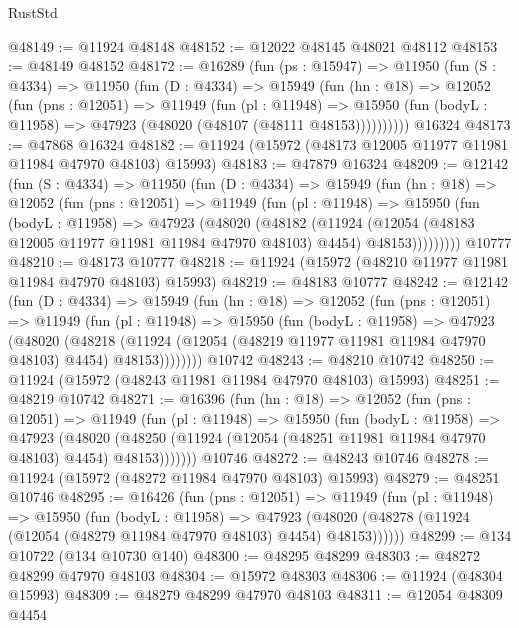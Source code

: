 \begin{lexlean}{RustStd}
\begin{coremodule}
{\begin{coremodule}
{{{{{{{{{{{{{{{{{{{{{{{{{{{{{{{{{{{{{{{{{{{{{{{{{{{{{{{{{{{{{{{{{{{{{{{{{{{{{{{{@48149 := @11924 @48148
@48152 := @12022 @48145 @48021 @48112
@48153 := @48149 @48152
@48172 := @16289
    (fun (ps : @15947) =>
    @11950
      (fun (S : @4334) =>
      @11950
        (fun (D : @4334) =>
        @15949
          (fun (hn : @18) =>
          @12052
            (fun (pns : @12051) =>
            @11949
              (fun (pl : @11948) =>
              @15950 (fun (bodyL : @11958) => @47923 (@48020 (@48107 (@48111 @48153))))))))))
    @16324
@48173 := @47868 @16324
@48182 := @11924 (@15972 (@48173 @12005 @11977 @11981 @11984 @47970 @48103) @15993)
@48183 := @47879 @16324
@48209 := @12142
    (fun (S : @4334) =>
    @11950
      (fun (D : @4334) =>
      @15949
        (fun (hn : @18) =>
        @12052
          (fun (pns : @12051) =>
          @11949
            (fun (pl : @11948) =>
            @15950
              (fun (bodyL : @11958) =>
              @47923
                (@48020
                  (@48182
                    (@11924
                      (@12054 (@48183 @12005 @11977 @11981 @11984 @47970 @48103) @4454)
                      @48153)))))))))
    @10777
@48210 := @48173 @10777
@48218 := @11924 (@15972 (@48210 @11977 @11981 @11984 @47970 @48103) @15993)
@48219 := @48183 @10777
@48242 := @12142
    (fun (D : @4334) =>
    @15949
      (fun (hn : @18) =>
      @12052
        (fun (pns : @12051) =>
        @11949
          (fun (pl : @11948) =>
          @15950
            (fun (bodyL : @11958) =>
            @47923
              (@48020
                (@48218
                  (@11924 (@12054 (@48219 @11977 @11981 @11984 @47970 @48103) @4454) @48153))))))))
    @10742
@48243 := @48210 @10742
@48250 := @11924 (@15972 (@48243 @11981 @11984 @47970 @48103) @15993)
@48251 := @48219 @10742
@48271 := @16396
    (fun (hn : @18) =>
    @12052
      (fun (pns : @12051) =>
      @11949
        (fun (pl : @11948) =>
        @15950
          (fun (bodyL : @11958) =>
          @47923
            (@48020
              (@48250 (@11924 (@12054 (@48251 @11981 @11984 @47970 @48103) @4454) @48153)))))))
    @10746
@48272 := @48243 @10746
@48278 := @11924 (@15972 (@48272 @11984 @47970 @48103) @15993)
@48279 := @48251 @10746
@48295 := @16426
    (fun (pns : @12051) =>
    @11949
      (fun (pl : @11948) =>
      @15950
        (fun (bodyL : @11958) =>
        @47923 (@48020 (@48278 (@11924 (@12054 (@48279 @11984 @47970 @48103) @4454) @48153))))))
@48299 := @134 @10722 (@134 @10730 @140)
@48300 := @48295 @48299
@48303 := @48272 @48299 @47970 @48103
@48304 := @15972 @48303
@48306 := @11924 (@48304 @15993)
@48309 := @48279 @48299 @47970 @48103
@48311 := @12054 @48309 @4454
}}}}}}}}}}}}}}}}}}}}}}}}}}}}}}}}}}}}}}}}}}}}}}}}}}}}}}}}}}}}}}}}}}}}}}}}}}}}}}}}
\end{coremodule}}
\end{coremodule}
\end{lexlean}
